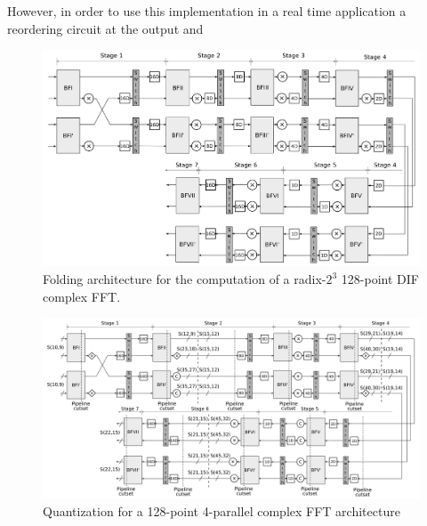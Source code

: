 \documentclass[journal,comsoc]{IEEEtran}
\begin{document}
However, in order to use this implementation in a real time application a reordering circuit at the output and 






\begin{figure} 
	\centering
	\includegraphics[width=0.6\linewidth]{Diagramas/folding-128.png}
	\caption{Folding architecture for the computation of a radix-$2^3$ 128-point DIF complex FFT.}
	\label{fig:folding_128}
\end{figure}


\begin{figure} 
	\centering
	\includegraphics[width=0.8\linewidth]{Diagramas/folding-128-quant-pipe.png}
	\caption{Quantization for a 128-point 4-parallel complex FFT architecture}
	\label{fig:4paralelo128pradix8cuantizacion1}
\end{figure}
\end{document}
